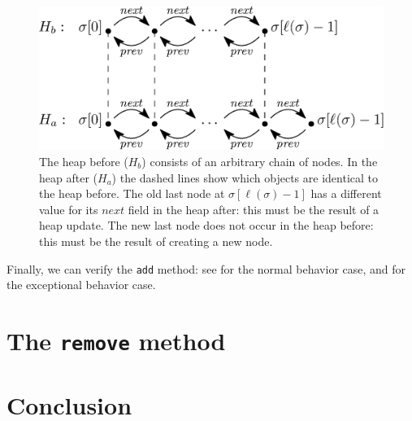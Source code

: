 \documentclass[runningheads]{llncs}
\begin{document}
\begin{figure}
   \centering
   \includegraphics[scale=0.4]{figures/linkedlist-linklast.eps}
   \caption{The heap before ($H_b$) consists of an arbitrary chain of nodes. In the heap after ($H_a$) the dashed lines show which objects are identical to the heap before. The old last node at $\sigma[\ell(\sigma)-1]$ has a different value for its $\mathit{next}$ field in the heap after: this must be the result of a heap update. The new last node does not occur in the heap before: this must be the result of creating a new node.}
   \vspace*{-6pt}
   \label{fig:linklast}
\end{figure}

Finally, we can verify the \texttt{add} method: see \cite[6:58--8:08]{Bian2019addbranch} for the normal behavior case, and \cite[8:09--]{Bian2019addbranch} for the exceptional behavior case.

\section{The \texttt{remove} method}\label{sec:remove}




\section{Conclusion}\label{sec:conclusion}



\end{document}
